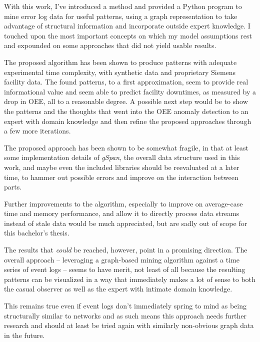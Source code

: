 \documentclass[pdftex,12pt,a4paper]{report}
\begin{document}
With this work, I've introduced a method and provided a Python program to mine error log data for useful patterns, using a graph representation to take advantage of structural information and incorporate outside expert knowledge. I touched upon the most important concepts on which my model assumptions rest and expounded on some approaches that did not yield usable results.

The proposed algorithm has been shown to produce patterns with adequate experimental time complexity, with synthetic data and proprietary Siemens facility data. The found patterns, to a first approximation, seem to provide real informational value and seem able to predict facility downtimes, as measured by a drop in OEE, all to a reasonable degree. A possible next step would be to show the patterns and the thoughts that went into the OEE anomaly detection to an expert with domain knowledge and then refine the proposed approaches through a few more iterations.

The proposed approach has been shown to be somewhat fragile, in that at least some implementation details of \textit{gSpan}, the overall data structure used in this work, and maybe even the included libraries should be reevaluated at a later time, to hammer out possible errors and improve on the interaction between parts. 

Further improvements to the algorithm, especially to improve on average-case time and memory performance, and allow it to directly process data streams instead of stale data would be much appreciated, but are sadly out of scope for this bachelor's thesis.

The results that \textit{could} be reached, however, point in a promising direction. The overall approach -- leveraging a graph-based mining algorithm against a time series of event logs -- seems to have merit, not least of all because the resulting patterns can be visualized in a way that immediately makes a lot of sense to both the casual observer as well as the expert with intimate domain knowledge.

This remains true even if event logs don't immediately spring to mind as being structurally similar to networks and as such means this approach needs further research and should at least be tried again with similarly non-obvious graph data in the future.
\end{document}
